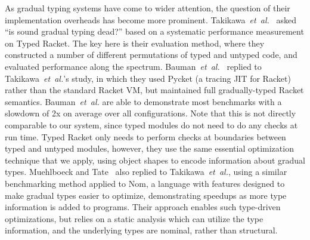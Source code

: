 As gradual typing systems have come to wider attention, the question of their
implementation overheads has become more prominent.  
Takikawa~\textit{et~al.}~\cite{Takikawa2016} asked ``is sound gradual typing
dead?'' based on a systematic performance measurement on Typed Racket.
The key here is their evaluation method, where they constructed a
number of different permutations of typed and untyped code, and
evaluated performance along the spectrum.
Bauman~\textit{et~al.}~\cite{Bauman2017} replied to Takikawa~\textit{et~al.}'s study, in which they used Pycket\citep{Pycket2015} (a tracing JIT for Racket)
rather than the standard Racket VM,
but maintained full gradually-typed Racket semantics.
Bauman~\textit{et~al.} are able to demonstrate most benchmarks
with a slowdown of 2x on average over all configurations.
Note that this is not directly comparable to our system,
since typed modules do not need to do any checks at run time.
Typed Racket only needs to perform checks at boundaries between typed and untyped modules,
however, they use the same essential optimization technique that we apply,
using object shapes to encode information about gradual types.
Muehlboeck and Tate~\cite{Muehlboeck2017} also replied to
Takikawa~\textit{et~al.}, using a similar benchmarking method applied
to Nom, a language with features designed to make gradual types easier
to optimize, demonstrating speedups as more type information is added
to programs.  Their approach enables such type-driven optimizations,
but relies on a static analysis which can utilize the type
information, and the underlying types are nominal, rather than
structural.




